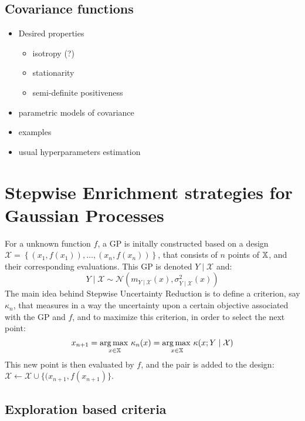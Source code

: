 \documentclass[../../Main_ManuscritThese.tex]{subfiles}
\newcommand\imgpath{/home/victor/acadwriting/Manuscrit/Text/Chapter4/img/}
\begin{document}
\subsection{Covariance functions}
\begin{figure}[ht]
  \centering
  
  \caption{\label{fig:label} }
\end{figure}

\label{sec:cov_fun}
\begin{itemize}
\item Desired properties
  \begin{itemize}
  \item isotropy (?)
  \item stationarity
  \item semi-definite positiveness
  \end{itemize}
\item parametric models of covariance
\item examples
\item usual hyperparameters estimation
\end{itemize}

\section{Stepwise Enrichment strategies for Gaussian Processes}
\label{sec:enrichment_strategies}
For a unknown function $f$, a GP is initally constructed based on a design $\mathcal{X} = \left\{\left(x_1,f(x_1)\right), \dots, \left(x_n, f(x_n)\right)\right\}$, that consists of $n$ points of $\mathbb{X}$, and their corresponding evaluations. This GP is denoted $Y \mid \mathcal{X}$ and:
\begin{equation}
  \label{eq:YgivenXGP}
  Y\mid \mathcal{X} \sim \mathcal{N}(m_{Y\mid\mathcal{X}}(x),\sigma^2_{Y\mid\mathcal{X}}(x))
\end{equation}
The main idea behind Stepwise Uncertainty Reduction is to define a criterion, say $\kappa_n$, that measures in a way the uncertainty upon a certain objective associated with the GP and $f$, and to maximize this criterion, in order to select the next point:
\begin{equation}
  x_{n+1} = \operatorname*{arg\,max \,}_{x\in\mathbb{X}} \kappa_n(x) = \operatorname*{arg\,max \,}_{x\in\mathbb{X}} \kappa(x; Y \mid \mathcal{X})
\end{equation}
This new point is then evaluated by $f$, and the pair is added to the design: $\mathcal{X} \gets \mathcal{X} \cup \{(x_{n+1}, f(x_{n+1})\}$.
\subsection{Exploration based criteria}
\end{document}
